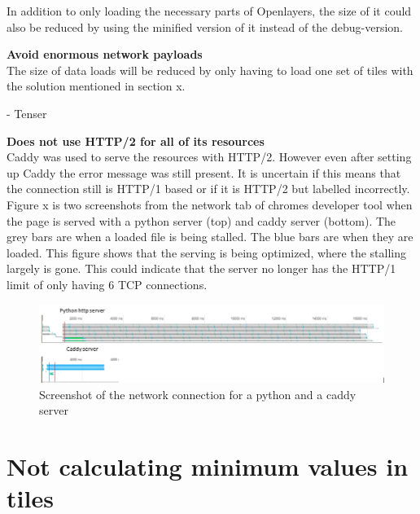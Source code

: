 In addition to only loading the necessary parts of Openlayers, the size of it could also be reduced by using the minified version of it instead of the debug-version.
\citep{OlModule}

\textbf{Avoid enormous network payloads}\\
The size of data loads will be reduced by only having to load one set of tiles with the solution mentioned in section x. 

-	Tenser 
 

\textbf{Does not use HTTP/2 for all of its resources}\\
Caddy was used to serve the resources with HTTP/2. However even after setting up Caddy the error message was still present. It is uncertain if this means that the connection still is HTTP/1 based or if it is HTTP/2 but labelled incorrectly. Figure x is two screenshots from the network tab of chromes developer tool when the page is served with a python server (top) and caddy server (bottom). 
The grey bars are when a loaded file is being stalled. The blue bars are when they are loaded. This figure shows that the serving is being optimized, where the stalling largely is gone. This could indicate that the server no longer has the HTTP/1 limit of only having 6 TCP connections.

\begin{figure} [H]
	\centering
	\includegraphics[width=.8\textwidth]{Pictures/CaddyVsPython}
	\caption{Screenshot of the network connection for a python and a caddy server}
	\label{CaddyVsPython}
\end{figure}


 

\section{Not calculating minimum values in tiles} \label{WhyNoMin}


